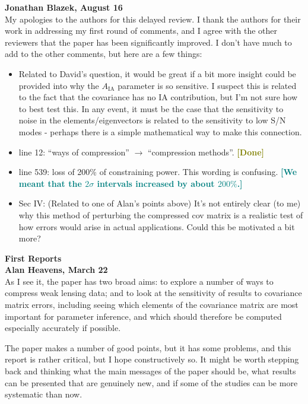 \documentclass{article}
\newcommand\reply[1]{{\bf {\textcolor{teal}{[#1]}}}}
\newcommand\done{{\bf {\textcolor{olive}{[Done]}}}}
\begin{document}
	
	\textbf{Jonathan Blazek, August 16} \\

    My apologies to the authors for this delayed review. I thank the authors for their work in addressing my first round of comments, and I agree with the other reviewers that the paper has been significantly improved. I don't have much to add to the other comments, but here are a few things: 
    \begin{itemize}
        \item Related to David's question, it would be great if a bit more insight could be provided into why the $A_{\mathrm{IA}}$ parameter is so sensitive. I suspect this is related to the fact that the covariance has no IA contribution, but I'm not sure how to best test this. In any event, it must be the case that the sensitivity to noise in the elements/eigenvectors is related to the sensitivity to low S/N modes - perhaps there is a simple mathematical way to make this connection.
        \item line 12: “ways of compression” $\rightarrow$ “compression methods”. \done
        \item line 539: loss of 200\% of constraining power. This wording is confusing. \reply{We meant that the $2 \sigma$ intervals increased by about $200\%$.}
        \item Sec IV: (Related to one of Alan's points above) It's not entirely clear (to me) why this method of perturbing the compressed cov matrix is a realistic test of how errors would arise in actual applications. Could this be motivated a bit more?
    \end{itemize}

    
    \pagebreak

    {\Large\textbf{First Reports}}\\
	
	\textbf{Alan Heavens, March 22} \\
	
	As I see it, the paper has two broad aims: to explore a number of ways to compress weak lensing data; and to look at the sensitivity of results to covariance matrix errors, including seeing which elements of the covariance matrix are most important for parameter inference, and which should therefore be computed especially accurately if possible.
	
	The paper makes a number of good points, but it has some problems, and this report is rather critical, but I hope constructively so.  It might be worth stepping back and thinking what the main messages of the paper should be, what results can be presented that are genuinely new, and if some of the studies can be more systematic than now.  \\
	
\end{document}
